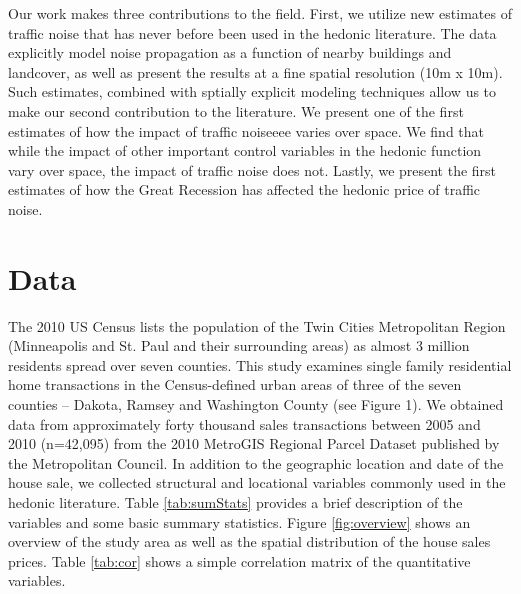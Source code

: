 \documentclass{article}\usepackage{graphicx, color}
\begin{document}
Our work makes three contributions to the field. First, we utilize new estimates of traffic noise that has never before been used in the hedonic literature. The data explicitly model noise propagation as a function of nearby buildings and landcover, as well as present the results at a fine spatial resolution (10m x 10m). Such estimates, combined with sptially explicit modeling techniques allow us to make our second contribution to the literature. We present one of the first estimates of how the impact of traffic noiseeee varies over space. We find that while the impact of other important control variables in the hedonic function vary over space, the impact of traffic noise does not. Lastly, we present the first estimates of how the Great Recession has affected the hedonic price of traffic noise.

\section{Data}
The 2010 US Census lists the population of the Twin Cities Metropolitan Region (Minneapolis and St. Paul and their surrounding areas)  as almost 3 million residents spread over seven counties. This study examines single family residential home transactions in the Census-defined urban areas of three of the seven counties – Dakota, Ramsey and Washington County (see Figure 1). We obtained data from approximately forty thousand sales transactions between 2005 and 2010 (n=42,095) from the 2010 MetroGIS Regional Parcel Dataset published by the Metropolitan Council. In addition to the geographic location and date of the house sale, we collected structural and locational variables commonly used in the hedonic literature. Table \ref{tab:sumStats} provides a brief description of the variables and some basic summary statistics. Figure \ref{fig:overview} shows an overview of the study area as well as the spatial distribution of the house sales prices. Table \ref{tab:cor} shows a simple correlation matrix of the quantitative variables.
\end{document}
